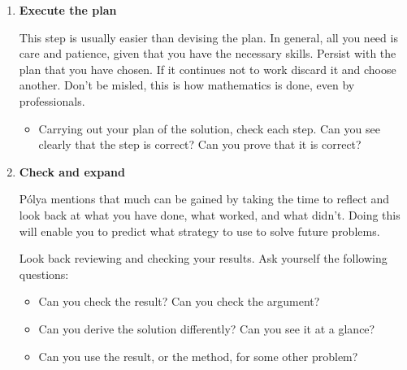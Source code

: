 \begin{enumerate}
\item \textbf{Execute the plan}

This step is usually easier than devising the plan. In general, all you need is care and patience, given that you have the necessary skills. Persist with the plan that you have chosen. If it continues not to work discard it and choose another. Don't be misled, this is how mathematics is done, even by professionals.

\begin{itemize}
\item Carrying out your plan of the solution, check each step. Can you see clearly that the step is correct? Can you prove that it is correct?
\end{itemize}

\item \textbf{Check and expand}

P\'{o}lya mentions that much can be gained by taking the time to reflect and look back at what you have done, what worked, and what didn't. Doing this will enable you to predict what strategy to use to solve future problems.

Look back reviewing and checking your results. Ask yourself the following questions:
\begin{itemize}
\item Can you check the result? Can you check the argument?
\item Can you derive the solution differently? Can you see it at a glance?
\item Can you use the result, or the method, for some other problem?
\end{itemize}
\end{enumerate}

